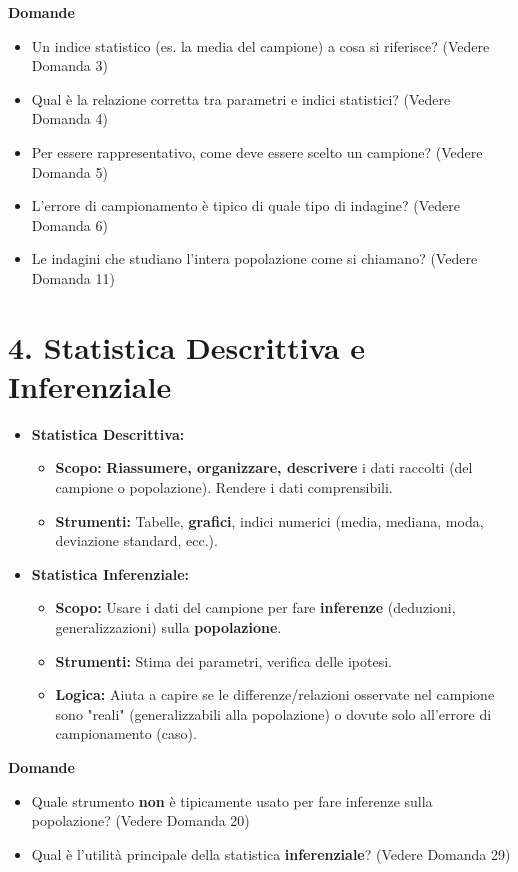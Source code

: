 \documentclass[12pt, a4paper]{article}
\newenvironment{reflectionbox}{%
    \begin{framed}\par\medskip\noindent
    \textbf{\color{boxtitlecolor}Domande} \par
    \begin{itemize}[leftmargin=*, label=$\blacktriangleright$]
}{%
    \end{itemize}\par\medskip
    \end{framed}
}
\begin{document}
\begin{reflectionbox}
    \item Un indice statistico (es. la media del campione) a cosa si riferisce? (Vedere Domanda 3)
    \item Qual è la relazione corretta tra parametri e indici statistici? (Vedere Domanda 4)
    \item Per essere rappresentativo, come deve essere scelto un campione? (Vedere Domanda 5)
    \item L'errore di campionamento è tipico di quale tipo di indagine? (Vedere Domanda 6)
    \item Le indagini che studiano l'intera popolazione come si chiamano? (Vedere Domanda 11)
\end{reflectionbox}

\section*{4. Statistica Descrittiva e Inferenziale}
\begin{itemize}
    \item \textbf{Statistica Descrittiva:}
        \begin{itemize}
            \item \textbf{Scopo:} \textbf{Riassumere, organizzare, descrivere} i dati raccolti (del campione o popolazione). Rendere i dati comprensibili.
            \item \textbf{Strumenti:} Tabelle, \textbf{grafici}, indici numerici (media, mediana, moda, deviazione standard, ecc.).
        \end{itemize}
    \item \textbf{Statistica Inferenziale:}
        \begin{itemize}
            \item \textbf{Scopo:} Usare i dati del campione per fare \textbf{inferenze} (deduzioni, generalizzazioni) sulla \textbf{popolazione}.
            \item \textbf{Strumenti:} Stima dei parametri, verifica delle ipotesi.
            \item \textbf{Logica:} Aiuta a capire se le differenze/relazioni osservate nel campione sono "reali" (generalizzabili alla popolazione) o dovute solo all'errore di campionamento (caso).
        \end{itemize}
\end{itemize}

\begin{reflectionbox}
    \item Quale strumento \textbf{non} è tipicamente usato per fare inferenze sulla popolazione? (Vedere Domanda 20)
    \item Qual è l'utilità principale della statistica \textbf{inferenziale}? (Vedere Domanda 29)
\end{reflectionbox}
\end{document}
